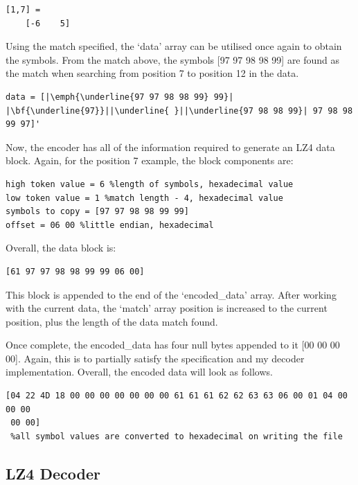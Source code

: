 \documentclass[12pt]{article}
\begin{document}
\begin{verbatim}
[1,7] =
	[-6    5]
\end{verbatim}

Using the match specified, the `data' array can be utilised once again to obtain the symbols. From the match above, the symbols [97 97 98 98 99] are found as the match when searching from position 7 to position 12 in the data.

\begin{verbatim}
data = [|\emph{\underline{97 97 98 98 99} 99}| |\bf{\underline{97}}||\underline{ }||\underline{97 98 98 99}| 97 98 98 99 97]'
\end{verbatim}

Now, the encoder has all of the information required to generate an LZ4 data block. Again, for the position 7 example, the block components are:

\begin{verbatim}
high token value = 6 %length of symbols, hexadecimal value
low token value = 1 %match length - 4, hexadecimal value
symbols to copy = [97 97 98 98 99 99]
offset = 06 00 %little endian, hexadecimal
\end{verbatim}

Overall, the data block is:

\begin{verbatim}
[61 97 97 98 98 99 99 06 00]
\end{verbatim}

This block is appended to the end of the `encoded\_data' array. After working with the current data, the `match' array position is increased to the current position, plus the length of the data match found.

Once complete, the encoded\_data has four null bytes appended to it [00 00 00 00]. Again, this is to partially satisfy the specification and my decoder implementation. Overall, the encoded data will look as follows. 

\begin{verbatim}
[04 22 4D 18 00 00 00 00 00 00 00 61 61 61 62 62 63 63 06 00 01 04 00 00 00 
 00 00]
 %all symbol values are converted to hexadecimal on writing the file
\end{verbatim}

\subsection{LZ4 Decoder}{\label{sec_lz4_decoder}}
\end{document}
